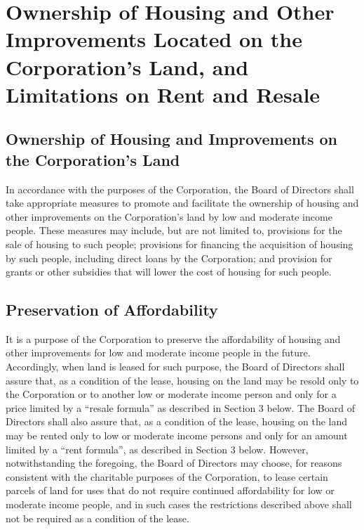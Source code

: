 \section{Ownership of Housing and Other Improvements Located on the Corporation's Land, and Limitations on Rent and Resale}

\subsection{Ownership of Housing and Improvements on the Corporation's Land}
In accordance with the purposes of the Corporation, the Board of
Directors shall take appropriate measures to promote and facilitate
the ownership of housing and other improvements on the Corporation's
land by low and moderate income people. These measures may include,
but are not limited to, provisions for the sale of housing to such
people; provisions for financing the acquisition of housing by such
people, including direct loans by the Corporation; and provision for
grants or other subsidies that will lower the cost of housing for such
people.

\subsection{Preservation of Affordability}
It is a purpose of the Corporation to preserve the affordability of
housing and other improvements for low and moderate income people in
the future. Accordingly, when land is leased for such purpose, the
Board of Directors shall assure that, as a condition of the lease,
housing on the land may be resold only to the Corporation or to
another low or moderate income person and only for a price limited by
a “resale formula” as described in Section 3 below. The Board of
Directors shall also assure that, as a condition of the lease, housing
on the land may be rented only to low or moderate income persons and
only for an amount limited by a “rent formula”, as described in
Section 3 below. However, notwithstanding the foregoing, the Board of
Directors may choose, for reasons consistent with the charitable
purposes of the Corporation, to lease certain parcels of land for uses
that do not require continued affordability for low or moderate income
people, and in such cases the restrictions described above shall not
be required as a condition of the lease.

